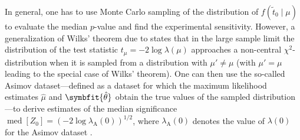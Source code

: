 \documentclass[b5paper, 10pt, twoside]{book}
\newcommand{\unitv}[1]{\symbfit{\hat{#1}}}
\DeclareMathOperator{\med}{med}
\begin{document}
In general, one has to use Monte Carlo sampling of the distribution of $f(\tilde{t}_0\mid\mu)$ to evaluate the median $p$-value and find the experimental sensitivity. However, a generalization of Wilks' theorem due to \textcite{Wald1943} states that in the large sample limit the distribution of the test statistic $t_\mu=-2\log\lambda(\mu)$ approaches a non-central $\chi^2$-distribution when it is sampled from a distribution with $\mu'\neq\mu$ (with $\mu'=\mu$ leading to the special case of Wilks' theorem). One can then use the so-called Asimov dataset---defined as a dataset for which the maximum likelihood estimates $\hat{\mu}$ and $\unitv{\theta}$ obtain the true values of the sampled distribution---to derive estimates of the median significance $\med[Z_0]=(-2\log\lambda_\text{A}(0))^{1/2}$, where $\lambda_\text{A}(0)$ denotes the value of $\lambda(0)$ for the Asimov dataset \parencite{CowanEtAl2011}.




\backmatter

\printbibliography[heading=bibintoc, title=References]
\end{document}

